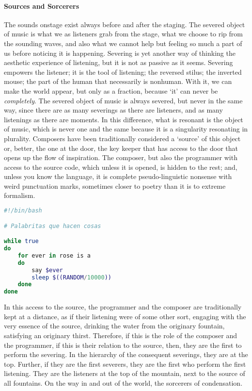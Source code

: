 \paragraph{Sources and Sorcerers}
The sounds onstage exist always before and after the staging. The severed object of music is what we as listeners grab from the stage, what we choose to rip from the sounding waves, and also what we cannot help but feeling so much a part of us before noticing it is happening. Severing is yet another way of thinking the aesthetic experience of listening, but it is not as passive as it seems. Severing empowers the listener; it is the tool of listening; the reversed stilus; the inverted mouse; the part of the human that necessarily is nonhuman. With it, we can make the world appear, but only as a fraction, because `it' can never be \textit{completely}. The severed object of music is always severed, but never in the same way, since there are as many severings as there are listeners, and as many listenings as there are moments. In this difference, what is resonant is the object of music, which is never one and the same because it is a singularity resonating in plurality. Composers have been traditionally considered a `source' of this object or, better, the one at the door, the key keeper that has access to the door that opens up the flow of inspiration. The composer, but also the programmer with access to the source code, which unless it is opened, is hidden to the rest; and, unless you know the language, it is complete pseudo-linguistic nonsense with weird punctuation marks, sometimes closer to poetry than it is to extreme formalism. 

\begin{flushleft}
\small
\begin{lstlisting}[caption={Little words that do things},captionpos=b,language=bash,mathescape=false]
#!/bin/bash

# Palabritas que hacen cosas

while true
do
	for ever in rose is a
	do 
		say $ever
		sleep $((RANDOM/10000))
	done
done

\end{lstlisting}
\end{flushleft}

In this access to the source, the programmer and the composer are traditionally kept at a distance, as if their listening were of some other sort, engaging with the very essence of the source, drinking the water from the originary fountain, satisfying an originary thirst. Therefore, if this is the role of the composer and the programmer, if this is their relation to the source, then, they are the first to perform the severing. In the hierarchy of the consequent severings, they are at the top. Further, if they are the first severers, they are the first who perform the first listening. They are the listeners at the top of the mountain, next to the source of all fountains. On the way in and out of the world, the sorcerers of condensation.

